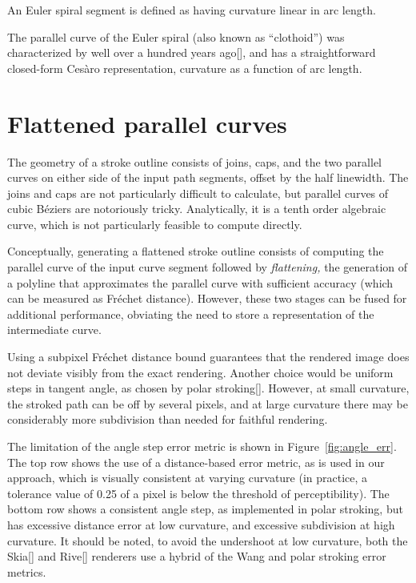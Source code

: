 \documentclass[sigconf]{acmart}
\begin{document}
An Euler spiral segment is defined as having curvature linear in arc length.

The parallel curve of the Euler spiral (also known as ``clothoid'') was characterized by \citet{Wieleitner1907} well over a hundred years ago[], and has a straightforward closed-form Cesàro representation, curvature as a function of arc length.

\section{Flattened parallel curves}

The geometry of a stroke outline consists of joins, caps, and the two parallel curves on either side of the input path segments, offset by the half linewidth. The joins and caps are not particularly difficult to calculate, but parallel curves of cubic Béziers are notoriously tricky. Analytically, it is a tenth order algebraic curve, which is not particularly feasible to compute directly.

Conceptually, generating a flattened stroke outline consists of computing the parallel curve of the input curve segment followed by \emph{flattening,} the generation of a polyline that approximates the parallel curve with sufficient accuracy (which can be measured as Fréchet distance). However, these two stages can be fused for additional performance, obviating the need to store a representation of the intermediate curve.

Using a subpixel Fréchet distance bound guarantees that the rendered image does not deviate visibly from the exact rendering. Another choice would be uniform steps in tangent angle, as chosen by polar stroking[]. However, at small curvature, the stroked path can be off by several pixels, and at large curvature there may be considerably more subdivision than needed for faithful rendering.

The limitation of the angle step error metric is shown in Figure~\ref{fig:angle_err}. The top row shows the use of a distance-based error metric, as is used in our approach, which is visually consistent at varying curvature (in practice, a tolerance value of 0.25 of a pixel is below the threshold of perceptibility). The bottom row shows a consistent angle step, as implemented in polar stroking, but has excessive distance error at low curvature, and excessive subdivision at high curvature. It should be noted, to avoid the undershoot at low curvature, both the Skia[] and Rive[] renderers use a hybrid of the Wang and polar stroking error metrics.
\end{document}
